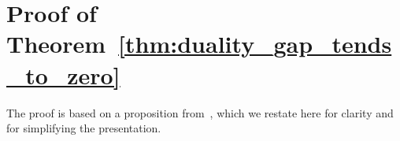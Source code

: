 \documentclass[journal, 10pt, twocolumn]{IEEEtran}
\begin{document}
\ifCLASSOPTIONcaptionsoff
  \newpage
\fi





























\appendices






\section{Proof of Theorem~\ref{thm:duality_gap_tends_to_zero} }\label{app:Proof_Th_relative_zero_duality}
The proof is based on a proposition from~\cite{Bertsekas-96}, which we restate here for clarity and for simplifying the presentation.
\end{document}
